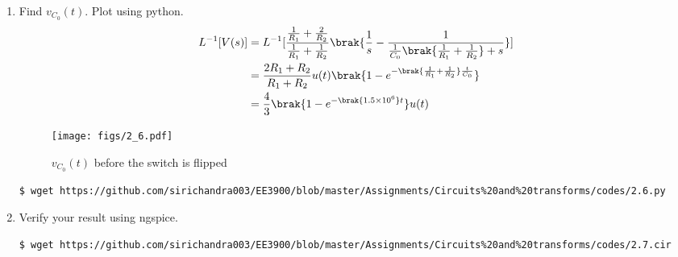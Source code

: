 \documentclass[journal,12pt,twocolumn]{IEEEtran}
\renewcommand\thesection{\arabic{section}}
\begin{document}
\begin{enumerate}[label=\arabic*.,ref=\thesection.\theenumi]
\item Find $v_{C_0}(t)$.  Plot using python. \\
\solution
\begin{align}
L^{-1}[V(s)]&=L^{-1}[\frac{\frac{1}{R_1} + \frac{2}{R_2}}{\frac{1}{R_1} + \frac{1}{R_2}}\brak{\frac{1}{s} - \frac{1}{\frac{1}{C_0}\brak{\frac{1}{R_1} + \frac{1}{R_2}} + s}}] \\
&=\frac{2R_1 + R_2}{R_1 + R_2}u(t)\brak{1 - e^{-\brak{\frac{1}{R_1} + \frac{1}{R_2}}\frac{t}{C_0}}} \\
&=\frac{4}{3}\brak{1 - e^{-\brak{1.5 \times 10^6}t}}u(t)
\end{align}
\begin{figure}[!ht]
\centering
\texttt{[image: figs/2\_6.pdf]}
\caption{$v_{C_0}(t)$ before the switch is flipped}
\label{fig:v1-t}
\end{figure}
\begin{lstlisting}
$ wget https://github.com/sirichandra003/EE3900/blob/master/Assignments/Circuits%20and%20transforms/codes/2.6.py
\end{lstlisting}
\item Verify your result using ngspice.
\solution
\begin{lstlisting}
$ wget https://github.com/sirichandra003/EE3900/blob/master/Assignments/Circuits%20and%20transforms/codes/2.7.cir
\end{lstlisting}
\end{enumerate}
\end{document}
